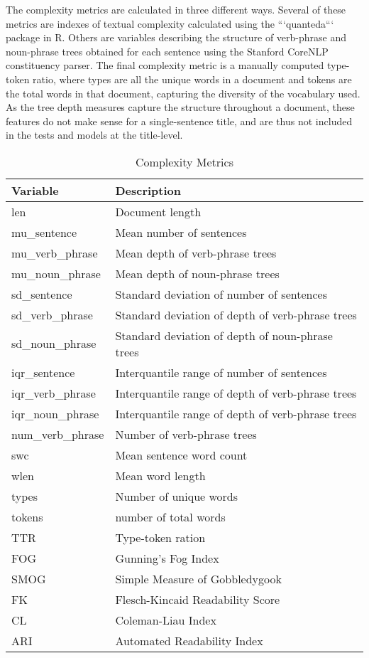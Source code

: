 \documentclass[../thesis.tex]{subfiles}
\begin{document}
The complexity metrics are calculated in three different ways. Several of these metrics are indexes of textual complexity calculated using the ```quanteda``` package in R. Others are variables describing the structure of verb-phrase and noun-phrase trees obtained for each sentence using the Stanford CoreNLP constituency parser. The final complexity metric is a manually computed type-token ratio, where types are all the unique words in a document and tokens are the total words in that document, capturing the diversity of the vocabulary used. As the tree depth measures capture the structure throughout a document, these features do not make sense for a single-sentence title, and are thus not included in the tests and models at the title-level.

\begin{longtable}[t]{ll}
\caption{\label{tab:}Complexity Metrics}\\
\toprule
Variable & Description\\
\midrule
len & Document length \\
mu\_sentence & Mean number of sentences\\
mu\_verb\_phrase & Mean depth of verb-phrase trees\\
mu\_noun\_phrase & Mean depth of noun-phrase trees\\
sd\_sentence & Standard deviation of number of sentences\\
sd\_verb\_phrase & Standard deviation of depth of verb-phrase trees\\
\addlinespace
sd\_noun\_phrase & Standard deviation of depth of noun-phrase trees\\
iqr\_sentence & Interquantile range of number of sentences\\
iqr\_verb\_phrase & Interquantile range of depth of verb-phrase trees\\
iqr\_noun\_phrase & Interquantile range of depth of verb-phrase trees\\
num\_verb\_phrase & Number of verb-phrase trees\\
\addlinespace
swc & Mean sentence word count\\
wlen & Mean word length\\
types & Number of unique words\\
tokens & number of total words\\
TTR & Type-token ration\\
\addlinespace
FOG & Gunning's Fog Index\\
SMOG & Simple Measure of Gobbledygook\\
FK & Flesch-Kincaid Readability Score\\
CL & Coleman-Liau Index\\
ARI & Automated Readability Index\\
\bottomrule
\end{longtable}
\end{document}
